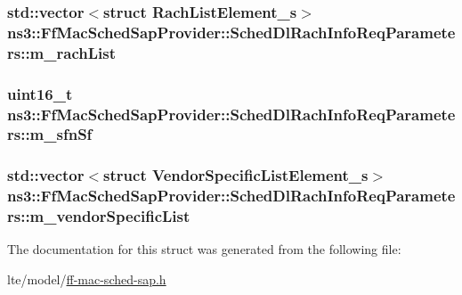 \subsubsection[{\texorpdfstring{m\+\_\+rach\+List}{m_rachList}}]{\setlength{\rightskip}{0pt plus 5cm}std\+::vector$<$struct {\bf Rach\+List\+Element\+\_\+s}$>$ ns3\+::\+Ff\+Mac\+Sched\+Sap\+Provider\+::\+Sched\+Dl\+Rach\+Info\+Req\+Parameters\+::m\+\_\+rach\+List}\hypertarget{structns3_1_1FfMacSchedSapProvider_1_1SchedDlRachInfoReqParameters_a4f53f438252b3f8eb1395a6d71725bd1}{}\label{structns3_1_1FfMacSchedSapProvider_1_1SchedDlRachInfoReqParameters_a4f53f438252b3f8eb1395a6d71725bd1}
\subsubsection[{\texorpdfstring{m\+\_\+sfn\+Sf}{m_sfnSf}}]{\setlength{\rightskip}{0pt plus 5cm}uint16\+\_\+t ns3\+::\+Ff\+Mac\+Sched\+Sap\+Provider\+::\+Sched\+Dl\+Rach\+Info\+Req\+Parameters\+::m\+\_\+sfn\+Sf}\hypertarget{structns3_1_1FfMacSchedSapProvider_1_1SchedDlRachInfoReqParameters_a8793f540590e2cad99aac88866b5c1bb}{}\label{structns3_1_1FfMacSchedSapProvider_1_1SchedDlRachInfoReqParameters_a8793f540590e2cad99aac88866b5c1bb}
\subsubsection[{\texorpdfstring{m\+\_\+vendor\+Specific\+List}{m_vendorSpecificList}}]{\setlength{\rightskip}{0pt plus 5cm}std\+::vector$<$struct {\bf Vendor\+Specific\+List\+Element\+\_\+s}$>$ ns3\+::\+Ff\+Mac\+Sched\+Sap\+Provider\+::\+Sched\+Dl\+Rach\+Info\+Req\+Parameters\+::m\+\_\+vendor\+Specific\+List}\hypertarget{structns3_1_1FfMacSchedSapProvider_1_1SchedDlRachInfoReqParameters_a6ab895c6cd20cb56f6ed4a9b75f273bb}{}\label{structns3_1_1FfMacSchedSapProvider_1_1SchedDlRachInfoReqParameters_a6ab895c6cd20cb56f6ed4a9b75f273bb}


The documentation for this struct was generated from the following file\+:\begin{DoxyCompactItemize}
\item 
lte/model/\hyperlink{ff-mac-sched-sap_8h}{ff-\/mac-\/sched-\/sap.\+h}\end{DoxyCompactItemize}

